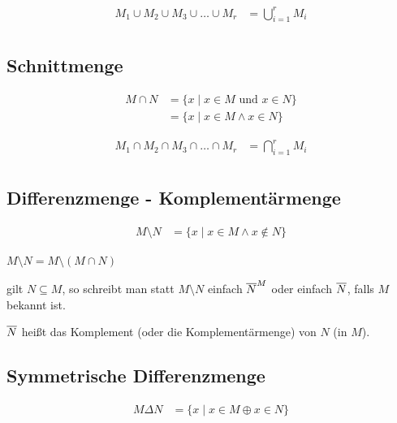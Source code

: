 \begin{align*}
	M_1\cup M_2\cup M_3\cup \ldots \cup M_r&=\bigcup\limits_{i=1}^{r}M_i\\
\end{align*}


\subsection{Schnittmenge}

\begin{align*}
	M\cap N &= \{x\mid x\in M\text{ und }x\in N\}\\
	&=\{x\mid x\in M \land x\in N\}
\end{align*}

\begin{align*}
	M_1\cap M_2\cap M_3\cap \ldots \cap M_r&=\bigcap\limits_{i=1}^{r}M_i\\
\end{align*}


\subsection{Differenzmenge - Komplementärmenge}

\begin{align*}
	M\setminus N &= \{x\mid x\in M \land x\not\in N\}
\end{align*}

\Beachte $M\setminus N = M \setminus (M\cap N)$


\Beachte gilt $N\subseteq M$, so schreibt man statt $M\setminus N$ einfach $\overline{N}^{M}$ oder einfach $\overline{N}$, falls $M$ bekannt ist.

$\overline{N}$ heißt das Komplement (oder die Komplementärmenge) von $N$ (in $M$).


\subsection{Symmetrische Differenzmenge}

\begin{align*}
	M\Delta N &= \{x\mid x\in M \oplus x\in N\}
\end{align*}

